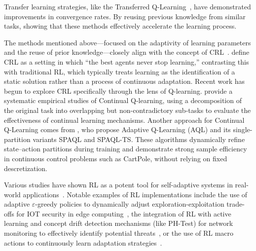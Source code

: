 Transfer learning strategies, like the Transferred Q-Learning~\cite{chen2022transferredqlearning}, 
have demonstrated improvements in convergence rates. By reusing previous knowledge from similar 
tasks, showing that these methods effectively accelerate the learning process.

The methods mentioned above—focused on the adaptivity of learning parameters and the reuse of prior knowledge—closely align with the concept of \ac{CRL}~\cite{khetarpal2022continualreinforcementlearningreview}.
\citet{abel2023definitioncontinualreinforcementlearning} define \ac{CRL} as a setting in which “the best agents never stop learning,” contrasting this with traditional \ac{RL}, which typically treats learning as the identification of a static solution rather than a process of continuous adaptation.
Recent work has begun to explore \ac{CRL} specifically through the lens of Q-learning.
\citet{Bagus2022} provide a systematic empirical studies of Continual Q-learning, using a decomposition of the original task into overlapping but non-contradictory sub-tasks to evaluate the effectiveness of continual learning mechanisms.
Another approach for Continual Q-Learning comes from \citet{araujo2020controladaptiveqlearning}, who propose Adaptive Q-Learning (AQL) and its single-partition variants SPAQL and SPAQL-TS. These algorithms dynamically refine state–action partitions during training and demonstrate strong sample efficiency in continuous control problems such as CartPole, without relying on fixed descretization.

Various studies have shown \ac{RL} as a potent tool for self-adaptive systems in real-world 
applications~\cite{HENRICHS2022106940}. Notable examples of \ac{RL} implementations 
include the use of adaptive $\varepsilon$-greedy policies to dynamically adjust exploration-exploitation 
trade-offs for \ac{IOT} security in edge computing~\cite{iotdynamicrl}, the integration of \ac{RL} 
with active learning and concept drift detection mechanisms (like PH-Test) for network monitoring to 
effectively identify potential threats~\cite{networkdynamicrl}, or the use of \ac{RL} macro actions to 
continuously learn adaptation strategies~\cite{cardozo23}.

